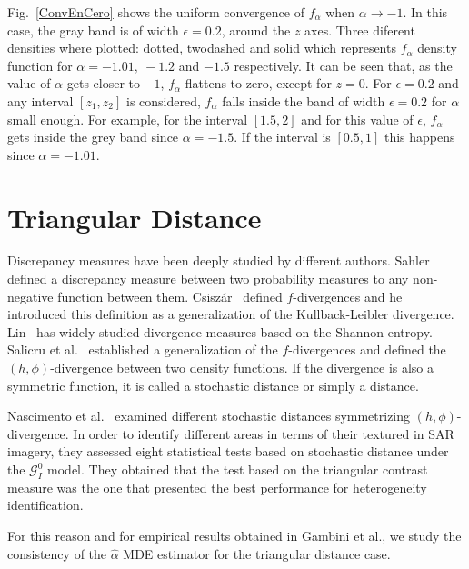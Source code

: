 \documentclass[journal]{IEEEtran}
\numberwithin{equation}{section}
\begin{document}
Fig.~\ref{ConvEnCero} shows the uniform convergence of $f_{\alpha}$ when $\alpha \to -1$. In this case, the gray band is of width $\epsilon=0.2$, around the $z$ axes. Three diferent densities where plotted: dotted, twodashed and solid which represents $f_{\alpha}$ density function for $\alpha=-1.01, \ -1.2$ and $-1.5$ respectively. It can be seen that, as the value of $\alpha$ gets closer to $-1$, $f_{\alpha}$ flattens to zero, except for $z=0$. For  $\epsilon=0.2$ and any interval $[z_1,z_2]$ is considered, $f_{\alpha}$ falls inside the band of width $\epsilon=0.2$ for $\alpha$ small enough. For example, for the interval $[1.5,2]$ and for this value of $\epsilon$, $f_{\alpha}$ gets inside the grey band since $\alpha=-1.5$. If the interval is $[0.5,1]$ this happens since $\alpha=-1.01$.
\section{Triangular Distance}
\label{DTsection}

Discrepancy measures have been deeply studied by different authors. Sahler~\cite{Sahler1970} defined a discrepancy measure between two probability measures to any non-negative
function between them. Csisz\'ar~\cite{Csiszar1967} defined $f$-divergences and he introduced this definition as a generalization of the Kullback-Leibler divergence. Lin~\cite{Lin1991} has widely studied divergence measures based on the Shannon entropy.  Salicru et al.~\cite{Salicru1994} established a generalization of the $f$-divergences and defined the $(h,\phi)$-divergence between two density functions. If the divergence is also a symmetric function, it is called a stochastic distance or simply a distance.

Nascimento et al.~\cite{Nascimento2009} examined different stochastic distances symmetrizing $(h,\phi)$-divergence. In order to identify different areas in terms of their textured in SAR imagery, they assessed eight statistical tests based on stochastic distance under the $\mathcal{G}_I^0$ model. They obtained that the test based on the triangular contrast measure was the one that presented the best performance for heterogeneity identification.

For this reason and for empirical results obtained in Gambini et al., we study the consistency of the $\widehat{\alpha}$ MDE estimator for the triangular distance case.
\end{document}
